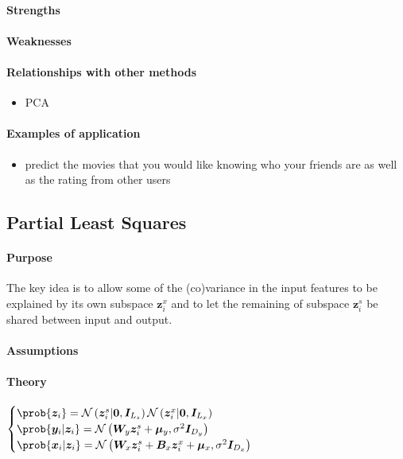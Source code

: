 \paragraph{Strengths}
\paragraph{Weaknesses}
\paragraph{Relationships with other methods}
\begin{itemize}
    \item PCA
\end{itemize}

\paragraph{Examples of application}
\begin{itemize}
    \item predict the movies that you would like knowing who your friends are as well 
        as the rating from other users
\end{itemize}


\subsection{Partial Least Squares}
\paragraph{Purpose}
The key idea is to allow some of the (co)variance in the input features to be explained
by its own subspace $\bm{z}_{i}^{x}$ and to let the remaining of subspace $\bm{z}_{i}^{
s}$ be shared between input and output.
\paragraph{Assumptions}
\paragraph{Theory}
$\begin{cases}
    \prob{\bm{z}_{i}} = \mathcal{N}\left(\bm{z}^{s}_{i}|\bm{0},\bm{I}_{L_{s}}\right)
    \mathcal{N}\left(\bm{z}^{x}_{i}|\bm{0},\bm{I}_{L_{x}}\right)\\
    \prob{\bm{y}_{i}|\bm{z}_{i}} = \mathcal{N}\left(\bm{W}_{y}\bm{z}^{s}_{i} + 
    \bm{\mu}_{y},\sigma^{2}\bm{I}_{D_{y}}
    \right)\\
        \prob{\bm{x}_{i}|\bm{z}_{i}} = \mathcal{N}\left(\bm{W}_{x}\bm{z}^{s}_{i} + \bm{B}_{x}
        \bm{z}^{x}_{i} + \bm{\mu}_{x},\sigma^{2}\bm{I}_{D_{x}}\right)
\end{cases}$
